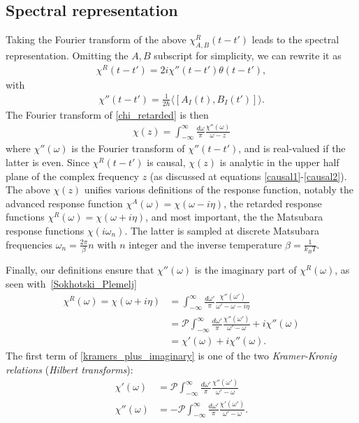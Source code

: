 \documentclass[notitlepage,11pt,nofootinbib]{revtex4-1}
\begin{document}
\subsection{Spectral representation}
Taking the Fourier transform of the above $\chi^R_{A,B}(t-t')$ leads to the spectral representation.
Omitting the $A,B$ subscript for simplicity, we can rewrite it as
\begin{align}
\chi^{R}(t-t') = 2i\chi''(t-t')\theta(t-t'),
\label{chi_retarded}
\end{align}
with
\begin{align}
\chi''(t-t') = \frac{1}{2\hbar}\langle [A_I(t),B_I(t')]\rangle.   
\end{align}
The Fourier transform of \eqref{chi_retarded} is then
\begin{align}
\chi(z) = \int_{-\infty}^{\infty} \frac{d\omega}{\pi} \frac{\chi''(\omega)}{\omega-z}
\label{spectral_representation}
\end{align}
where $\chi''(\omega)$ is the Fourier transform of $\chi''(t-t')$, and is real-valued if the latter is even. Since $\chi^{R}(t-t')$ is causal, $\chi(z)$ is analytic in the upper half plane of the complex frequency $z$ (as discussed at equations \eqref{causal1}-\eqref{causal2}). The above $\chi(z)$ unifies various definitions of the response function, notably the advanced response function $\chi^{A}(\omega) = \chi(\omega-i\eta)$, the retarded response functions $\chi^{R}(\omega) = \chi(\omega+i\eta)$, and most important, the the Matsubara response functions $\chi(i\omega_n)$. The latter is
sampled at discrete Matsubara frequencies $\omega_{n} = \frac{2\pi}{\beta}n$ with $n$ integer and the inverse temperature $\beta=\frac{1}{k_B T}$.

Finally, our definitions ensure that $\chi''(\omega)$ is the imaginary part of $\chi^R(\omega)$, as seen with~\eqref{Sokhotski_Plemelj}
\begin{align}
\chi^R(\omega) = \chi(\omega+i\eta) 
&= 
\int_{-\infty}^{\infty} \frac{d\omega'}{\pi} \frac{\chi''(\omega')}{\omega'-\omega-i\eta}
\\
&=
\mathcal P\int_{-\infty}^{\infty} \frac{d\omega'}{\pi} \frac{\chi''(\omega')}{\omega'-\omega}
+i\chi''(\omega)
\label{kramers_plus_imaginary}
\\
&=\chi'(\omega)+i\chi''(\omega).
\end{align}
The first term of \eqref{kramers_plus_imaginary} is one of the two \emph{Kramer-Kronig relations} (\emph{Hilbert transforms}):
\begin{align}
\chi'(\omega) &= \mathcal P\int_{-\infty}^{\infty} \frac{d\omega'}{\pi} \frac{\chi''(\omega')}{\omega'-\omega}
\\
\chi''(\omega) &= -\mathcal P\int_{-\infty}^{\infty} \frac{d\omega'}{\pi} \frac{\chi'(\omega')}{\omega'-\omega}.
\end{align}
\end{document}
